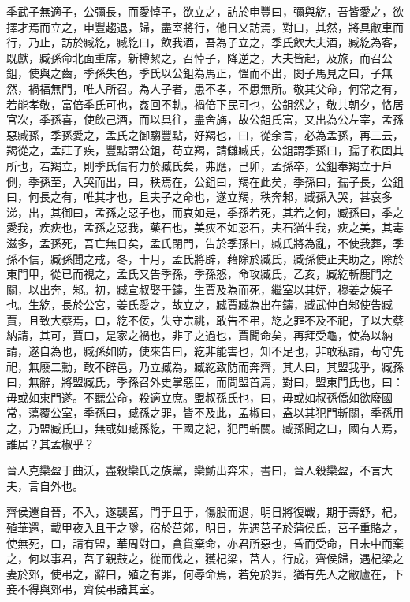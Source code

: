 \begin{pinyinscope}
季武子無適子，公彌長，而愛悼子，欲立之，訪於申豐曰，彌與紇，吾皆愛之，欲擇才焉而立之，申豐趨退，歸，盡室將行，他日又訪焉，對曰，其然，將具敝車而行，乃止，訪於臧紇，臧紇曰，飲我酒，吾為子立之，季氏飲大夫酒，臧紇為客，既獻，臧孫命北面重席，新樽絜之，召悼子，降逆之，大夫皆起，及旅，而召公鉏，使與之齒，季孫失色，季氏以公鉏為馬正，慍而不出，閔子馬見之曰，子無然，禍福無門，唯人所召。為人子者，患不孝，不患無所。敬其父命，何常之有，若能孝敬，富倍季氏可也，姦回不軌，禍倍下民可也，公鉏然之，敬共朝夕，恪居官次，季孫喜，使飲己酒，而以具往，盡舍㫋，故公鉏氏富，又出為公左宰，孟孫惡臧孫，季孫愛之，孟氏之御騶豐點，好羯也，曰，從余言，必為孟孫，再三云，羯從之，孟莊子疾，豐點謂公鉏，苟立羯，請讎臧氏，公鉏謂季孫曰，孺子秩固其所也，若羯立，則季氏信有力於臧氏矣，弗應，己卯，孟孫卒，公鉏奉羯立于戶側，季孫至，入哭而出，曰，秩焉在，公鉏曰，羯在此矣，季孫曰，孺子長，公鉏曰，何長之有，唯其才也，且夫子之命也，遂立羯，秩奔邾，臧孫入哭，甚哀多涕，出，其御曰，孟孫之惡子也，而哀如是，季孫若死，其若之何，臧孫曰，季之愛我，疾疢也，孟孫之惡我，藥石也，美疢不如惡石，夫石猶生我，疢之美，其毒滋多，孟孫死，吾亡無日矣，孟氏閉門，告於季孫曰，臧氏將為亂，不使我葬，季孫不信，臧孫聞之戒，冬，十月，孟氏將辟，藉除於臧氏，臧孫使正夫助之，除於東門甲，從已而視之，孟氏又告季孫，季孫怒，命攻臧氏，乙亥，臧紇斬鹿門之關，以出奔，邾。初，臧宣叔娶于鑄，生賈及為而死，繼室以其姪，穆姜之姨子也。生紇，長於公宮，姜氏愛之，故立之，臧賈臧為出在鑄，臧武仲自邾使告臧賈，且致大蔡焉，曰，紇不佞，失守宗祧，敢告不弔，紇之罪不及不祀，子以大蔡納請，其可，賈曰，是家之禍也，非子之過也，賈聞命矣，再拜受龜，使為以納請，遂自為也，臧孫如防，使來告曰，紇非能害也，知不足也，非敢私請，苟守先祀，無廢二勳，敢不辟邑，乃立臧為，臧紇致防而奔齊，其人曰，其盟我乎，臧孫曰，無辭，將盟臧氏，季孫召外史掌惡臣，而問盟首焉，對曰，盟東門氏也，曰：毋或如東門遂。不聽公命，殺適立庶。盟叔孫氏也，曰，毋或如叔孫僑如欲廢國常，蕩覆公室，季孫曰，臧孫之罪，皆不及此，孟椒曰，盍以其犯門斬關，季孫用之，乃盟臧氏曰，無或如臧孫紇，干國之紀，犯門斬關。臧孫聞之曰，國有人焉，誰居？其孟椒乎？

晉人克欒盈于曲沃，盡殺欒氏之族黨，欒魴出奔宋，書曰，晉人殺欒盈，不言大夫，言自外也。

齊侯還自晉，不入，遂襲莒，門于且于，傷股而退，明日將復戰，期于壽舒，杞，殖華還，載甲夜入且于之隧，宿於莒郊，明日，先遇莒子於蒲侯氏，莒子重賂之，使無死，曰，請有盟，華周對曰，貪貨棄命，亦君所惡也，昏而受命，日未中而棄之，何以事君，莒子親鼓之，從而伐之，獲杞梁，莒人，行成，齊侯歸，遇杞梁之妻於郊，使弔之，辭曰，殖之有罪，何辱命焉，若免於罪，猶有先人之敝廬在，下妾不得與郊弔，齊侯弔諸其室。


\end{pinyinscope}

